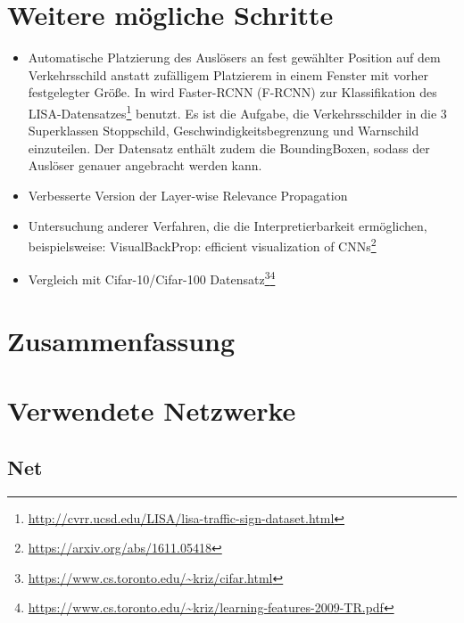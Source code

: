 \documentclass[twoside, 12pt,a4paper]{article}
\numberwithin{equation}{section}
\begin{document}
	\section{Weitere mögliche Schritte} \label{chapter_weitereSchritte}
	\begin{itemize}
		\item Automatische Platzierung des Auslösers an fest gewählter Position auf dem Verkehrsschild anstatt zufälligem Platzierem in einem Fenster mit vorher festgelegter Größe. In \cite{badnets} wird  Faster-RCNN (F-RCNN) zur Klassifikation des LISA-Datensatzes\footnote{\url{http://cvrr.ucsd.edu/LISA/lisa-traffic-sign-dataset.html}} benutzt. Es ist die Aufgabe, die Verkehrsschilder in die 3 Superklassen Stoppschild, Geschwindigkeitsbegrenzung und Warnschild einzuteilen. Der Datensatz enthält zudem die BoundingBoxen, sodass der Auslöser genauer angebracht werden kann.
		\item Verbesserte Version der Layer-wise Relevance Propagation
		\item Untersuchung anderer Verfahren, die die Interpretierbarkeit ermöglichen, beispielsweise: VisualBackProp: efficient visualization of CNNs\footnote{\url{https://arxiv.org/abs/1611.05418}}
		\item Vergleich mit Cifar-10/Cifar-100 Datensatz\footnote{\url{https://www.cs.toronto.edu/~kriz/cifar.html}}\footnote{\url{https://www.cs.toronto.edu/~kriz/learning-features-2009-TR.pdf}}
	\end{itemize}


	\section{Zusammenfassung} \label{chapter_conclusion}
	
	\printglossaries
	\newpage
	\appendix
	\section{Verwendete Netzwerke}
	\subsection{Net}
	
\end{document}
